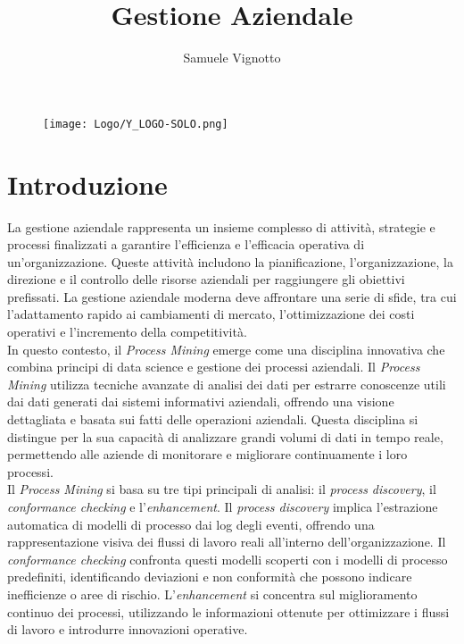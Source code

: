 \documentclass{article}
\title{\Huge{\textbf{Gestione Aziendale}}\vspace{-1em}}
\author{Samuele Vignotto}
\date{}
\begin{document}
\maketitle
\begin{figure}[h]
  \centering
  \texttt{[image: Logo/Y\_LOGO-SOLO.png]}
  \label{fig:immagine}
\end{figure}

\newpage
\tableofcontents
\newpage

\section{Introduzione}
La gestione aziendale rappresenta un insieme complesso di attività, strategie e processi finalizzati a garantire l'efficienza e l'efficacia operativa di un'organizzazione. Queste attività includono la pianificazione, l'organizzazione, la direzione e il controllo delle risorse aziendali per raggiungere gli obiettivi prefissati. La gestione aziendale moderna deve affrontare una serie di sfide, tra cui l'adattamento rapido ai cambiamenti di mercato, l'ottimizzazione dei costi operativi e l'incremento della competitività.\\

In questo contesto, il \textit{Process Mining} emerge come una disciplina innovativa che combina principi di data science e gestione dei processi aziendali. Il \textit{Process Mining} utilizza tecniche avanzate di analisi dei dati per estrarre conoscenze utili dai dati generati dai sistemi informativi aziendali, offrendo una visione dettagliata e basata sui fatti delle operazioni aziendali. Questa disciplina si distingue per la sua capacità di analizzare grandi volumi di dati in tempo reale, permettendo alle aziende di monitorare e migliorare continuamente i loro processi.\\

Il \textit{Process Mining} si basa su tre tipi principali di analisi: il \textit{process discovery}, il \textit{conformance checking} e l'\textit{enhancement}. Il \textit{process discovery} implica l'estrazione automatica di modelli di processo dai log degli eventi, offrendo una rappresentazione visiva dei flussi di lavoro reali all'interno dell'organizzazione. Il \textit{conformance checking} confronta questi modelli scoperti con i modelli di processo predefiniti, identificando deviazioni e non conformità che possono indicare inefficienze o aree di rischio. L'\textit{enhancement} si concentra sul miglioramento continuo dei processi, utilizzando le informazioni ottenute per ottimizzare i flussi di lavoro e introdurre innovazioni operative.\\
\end{document}
